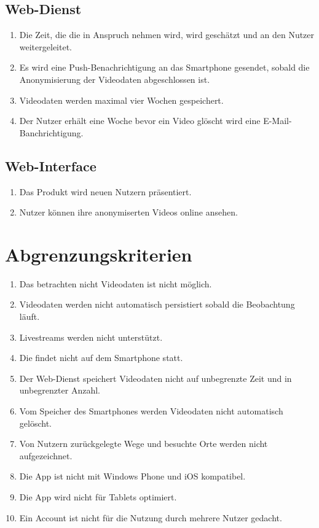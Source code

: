 \subsection{Web-Dienst}
	\begin{enumerate}
	\renewcommand{\labelenumi}{\textbf{\theenumi}}
	\renewcommand{\theenumi}{WK\arabic{enumi}0}
	\setcounter{enumi}{199}
	\item Die Zeit, die die  in Anspruch nehmen wird, wird geschätzt und an den Nutzer weitergeleitet.
	\item Es wird eine Push-Benachrichtigung an das \gls{Smartphone} gesendet, sobald die Anonymisierung der Videodaten abgeschlossen ist.
	\item Videodaten werden maximal vier Wochen gespeichert.
	\item Der Nutzer erhält eine Woche bevor ein Video glöscht wird eine \gls{E-Mail}-Banchrichtigung.
	\end{enumerate}
\subsection{Web-Interface}
	\begin{enumerate}
	\renewcommand{\labelenumi}{\textbf{\theenumi}}
	\renewcommand{\theenumi}{WK\arabic{enumi}0}
	\setcounter{enumi}{299}
	\item Das Produkt wird neuen Nutzern präsentiert.
	\item Nutzer können ihre anonymiserten Videos online ansehen.
	\end{enumerate}

\section{Abgrenzungskriterien}
	\begin{enumerate}
	\renewcommand{\labelenumi}{\textbf{\theenumi}}
	\renewcommand{\theenumi}{AK\arabic{enumi}0}
	\setcounter{enumi}{99}
	\item Das betrachten nicht  Videodaten ist nicht möglich.
	\item Videodaten werden nicht automatisch persistiert sobald die Beobachtung läuft.
	\item \glspl{Livestream} werden nicht unterstützt.
	\item Die  findet nicht auf dem \gls{Smartphone} statt.
	\item Der \gls{Web-Dienst} speichert Videodaten nicht auf unbegrenzte Zeit und in unbegrenzter Anzahl.
	\item Vom Speicher des Smartphones werden Videodaten nicht automatisch gelöscht.
	\item Von Nutzern zurückgelegte Wege und besuchte Orte werden nicht aufgezeichnet.
	\item Die \gls{App} ist nicht mit \gls{Windows Phone} und \gls{iOS} kompatibel.
	\item Die \gls{App} wird nicht für \glspl{Tablet} optimiert.
	\item Ein Account ist nicht für die Nutzung durch mehrere Nutzer gedacht.
	\end{enumerate}